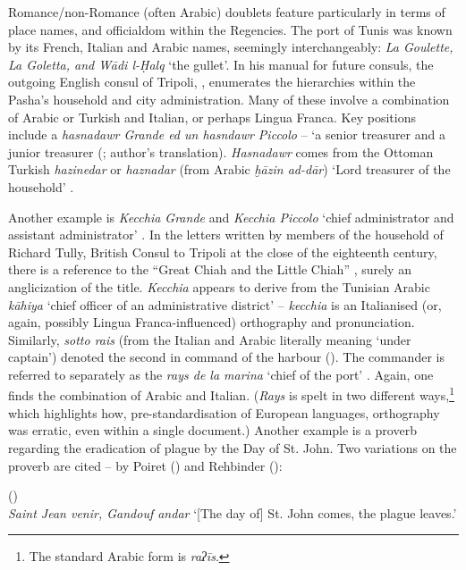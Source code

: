 \documentclass[output=paper]{langsci/langscibook}
\begin{document}
	Romance/non-Romance (often Arabic) doublets feature particularly in terms of place names, and officialdom within the Regencies. The port of Tunis was known by its French, Italian and Arabic names, seemingly interchangeably: \textit{La Goulette, La Goletta, and Wādi l-Ḥalq} ‘the gullet’. In his manual for future consuls, the outgoing English consul of Tripoli, , enumerates the hierarchies within the Pasha’s household and city administration. Many of these involve a combination of Arabic or Turkish and Italian, or perhaps Lingua Franca. Key positions include a \textit{hasnadawr Grande ed un hasndawr Piccolo} – ‘a senior treasurer and a junior treasurer (\citealt[97]{Pennell1982}; author's translation).  \textit{Hasnadawr} comes from the Ottoman Turkish \textit{hazinedar} or \textit{haznadar} (from Arabic \textit{ḫāzin ad-dār}) ‘Lord treasurer of the household’ \citep{Gilson1987}.
	
	Another example is \textit{Kecchia Grande} and \textit{Kecchia Piccolo} ‘chief administrator and assistant administrator’ \citep[104]{Pennell1982}. In the letters written by members of the household of Richard Tully, British Consul to Tripoli at the close of the eighteenth century, there is a reference to the ``Great Chiah and the Little Chiah'' \citep[70]{Tully1819}, surely an anglicization of the title. \textit{Kecchia} appears to derive from the Tunisian Arabic \textit{kāhiya} ‘chief officer of an administrative district’ – \textit{kecchia} is an Italianised (or, again, possibly Lingua Franca-influenced) orthography and pronunciation. Similarly, \textit{sotto rais} (from the Italian and Arabic literally meaning ‘under captain’) denoted the second in command of the harbour (\citealt[97, 100]{Pennell1982}). The commander is referred to separately as the \textit{rays de la marina} ‘chief of the port’ \citep[92]{Pennell1982}. Again, one finds the combination of Arabic and Italian. (\textit{Rays} is spelt in two different ways,\footnote{The standard Arabic form is \textit{raʔīs}.} which highlights how, pre-standardisation of European languages, orthography was erratic, even within a single document.) Another example is a proverb regarding the eradication of plague by the Day of St. John. Two variations on the proverb are cited – by Poiret (\citeyear{Poiret1802}) and Rehbinder (\citeyear{Rehbinder1800}): 
	
	\ea
	(\citealt{Poiret1802})\\
	\textit{Saint Jean venir, Gandouf andar} 
	\glt ‘[The day of] St. John comes, the plague leaves.’
	\z
	
\end{document}
